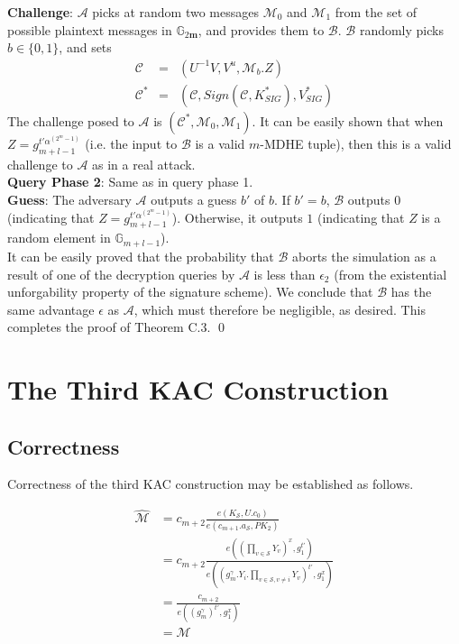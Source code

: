 \noindent \textbf{Challenge}: $\mathcal{A}$ picks at random two messages $\mathcal{M}_0$ and $\mathcal{M}_1$ from the set of possible plaintext messages in $\mathbb{G}_{2\mathbf{m}}$, and provides them to $\mathcal{B}$. $\mathcal{B}$ randomly picks $b\in\{0,1\}$, and sets 
\begin{eqnarray}
 \mathcal{C}&=&(U^{-1}V,V^u,\mathcal{M}_b.Z) \nonumber\\
 \mathcal{C}^{*}&=&(\mathcal{C},Sign(\mathcal{C},K^{*}_{SIG}),V^{*}_{SIG})\nonumber
\end{eqnarray}
\noindent The challenge posed to $\mathcal{A}$ is $(\mathcal{C}^{*},\mathcal{M}_0,\mathcal{M}_1)$. It can be easily shown that when $Z=g^{t'\alpha^{(2^m-1)}}_{m+l-1}$ (i.e. the input to $\mathcal{B}$ is a valid $m$-MDHE tuple), then this is a valid challenge to $\mathcal{A}$ as in a real attack.\\

\noindent\textbf{Query Phase 2}: Same as in query phase 1.\\
 
\noindent \textbf{Guess}: The adversary $\mathcal{A}$ outputs a guess $b'$ of $b$. If $b' = b$, $\mathcal{B}$ outputs $0$ (indicating that $Z=g^{t'\alpha^{(2^m-1)}}_{m+l-1}$). Otherwise, it outputs $1$ (indicating that $Z$ is a random element in $\mathbb{G}_{m+l-1}$).\\

\noindent It can be easily proved that the probability that $\mathcal{B}$ aborts the simulation as a result of one of the decryption queries by $\mathcal{A}$ is less than $\epsilon_2$ (from the existential unforgability property of the signature scheme). We conclude that $\mathcal{B}$ has the same advantage $\epsilon$ as $\mathcal{A}$, which must therefore be negligible, as desired. This completes the proof of Theorem C.3. \hfill\qed



\section{The Third KAC Construction}

\subsection{Correctness}
\label{app_sec:proof_correctness_3}

Correctness of the third KAC construction may be established as follows.

\begin{equation}
 \begin{split}
  \hat{\mathcal{M}}&=c_{m+2}\frac{{e}(K_{\mathcal{S}},U.c_0)}{{e}(c_{m+1}.a_{\mathcal{S}},PK_2)}\\
  &=c_{m+2}\frac{e\left(\left(\prod_{v\in\mathcal{S}}{Y_{v}}\right)^x,g^{t'}_1\right)}{e\left(\left(g^{\gamma}_m.{Y_i}.\prod_{v\in\mathcal{S},v\neq i}Y_{v}\right)^{t'},g^x_1\right)}\\
  &=\frac{c_{m+2}}{e(\left(g^{\gamma}_m\right)^{t'},g^{x}_1)}\\
  &=\mathcal{M}\nonumber
 \end{split}
\end{equation}


